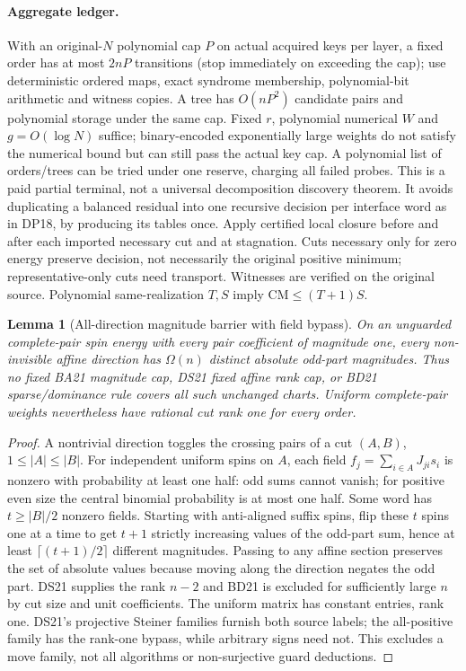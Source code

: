 \documentclass[11pt]{article}
\newtheorem{lemma}[theorem]{Lemma}
\begin{document}
\paragraph{Aggregate ledger.} With an original-$N$ polynomial cap $P$ on actual acquired keys per layer, a fixed order has at most $2nP$ transitions (stop immediately on exceeding the cap); use deterministic ordered maps, exact syndrome membership, polynomial-bit arithmetic and witness copies. A tree has $O(nP^2)$ candidate pairs and polynomial storage under the same cap. Fixed $r$, polynomial numerical $W$ and $g=O(\log N)$ suffice; binary-encoded exponentially large weights do not satisfy the numerical bound but can still pass the actual key cap. A polynomial list of orders/trees can be tried under one reserve, charging all failed probes. This is a paid partial terminal, not a universal decomposition discovery theorem. It avoids duplicating a balanced residual into one recursive decision per interface word as in DP18, by producing its tables once. Apply certified local closure before and after each imported necessary cut and at stagnation. Cuts necessary only for zero energy preserve decision, not necessarily the original positive minimum; representative-only cuts need transport. Witnesses are verified on the original source. Polynomial same-realization $T,S$ imply $\mathrm{CM}\le(T+1)S$.
\begin{lemma}[All-direction magnitude barrier with field bypass]\label{lem:dp22-magnitude}
On an unguarded complete-pair spin energy with every pair coefficient of magnitude one, every non-invisible affine direction has $\Omega(n)$ distinct absolute odd-part magnitudes. Thus no fixed BA21 magnitude cap, DS21 fixed affine rank cap, or BD21 sparse/dominance rule covers all such unchanged charts. Uniform complete-pair weights nevertheless have rational cut rank one for every order.
\end{lemma}
\begin{proof}
A nontrivial direction toggles the crossing pairs of a cut $(A,B)$, $1\le |A|\le|B|$. For independent uniform spins on $A$, each field $f_j=\sum_{i\in A}J_{ji}s_i$ is nonzero with probability at least one half: odd sums cannot vanish; for positive even size the central binomial probability is at most one half. Some word has $t\ge |B|/2$ nonzero fields. Starting with anti-aligned suffix spins, flip these $t$ spins one at a time to get $t+1$ strictly increasing values of the odd-part sum, hence at least $\lceil(t+1)/2\rceil$ different magnitudes. Passing to any affine section preserves the set of absolute values because moving along the direction negates the odd part. DS21 supplies the rank $n-2$ and BD21 is excluded for sufficiently large $n$ by cut size and unit coefficients. The uniform matrix has constant entries, rank one. DS21's projective Steiner families furnish both source labels; the all-positive family has the rank-one bypass, while arbitrary signs need not. This excludes a move family, not all algorithms or non-surjective guard deductions.
\end{proof}
\end{document}
